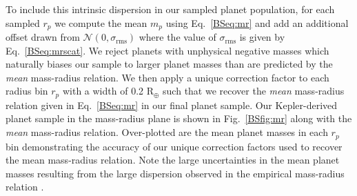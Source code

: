 \noindent To include this intrinsic dispersion in our sampled planet population, for each sampled $r_p$
we compute the mean $m_p$ using Eq.~\ref{BSeq:mr} and add an additional offset drawn from
$\mathcal{N}(0,\sigma_{\text{rms}})$
where the value of $\sigma_{\text{rms}}$ is given by Eq.~\ref{BSeq:mrscat}. We reject planets with unphysical
negative masses
which naturally biases our sample to larger planet masses than are predicted by the \emph{mean} mass-radius
relation. We then apply a unique correction factor to each radius bin $r_p$ with a width of 0.2 R$_{\oplus}$
such that we recover the \emph{mean} mass-radius relation given in Eq.~\ref{BSeq:mr} in our final planet sample.
Our Kepler-derived planet sample in the mass-radius plane is shown in Fig.~\ref{BSfig:mr} along with the 
\emph{mean} mass-radius relation. Over-plotted are the mean planet masses in each $r_p$ bin demonstrating the
accuracy of our unique correction factors used to recover the mean mass-radius relation. Note the large
uncertainties in the mean planet masses resulting from the large dispersion observed in the empirical mass-radius
relation \citep{weiss14}.

